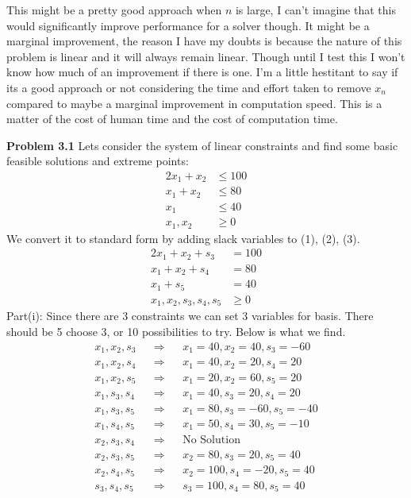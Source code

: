 \documentclass{article}
\begin{document}
This might be a pretty good approach when $n$ is large, I can't imagine that this would significantly improve performance for a solver though. It might be a marginal improvement, the reason I have my doubts is because the nature of this problem is linear and it will always remain linear. Though until I test this I won't know how much of an improvement if there is one. I'm a little hestitant to say if its a good approach or not considering the time and effort taken to remove $x_n$ compared to maybe a marginal improvement in computation speed. This is a matter of the cost of human time and the cost of computation time.

\textbf{Problem 3.1} Lets consider the system of linear constraints and find some basic feasible solutions and extreme points:
\begin{align}
    2x_1 + x_2 & \leq 100 \\
    x_1 + x_2 & \leq 80 \\
    x_1 & \leq 40 \\
    x_1, x_2 & \geq 0
\end{align} We convert it to standard form by adding slack variables to (1), (2), (3). 
\begin{align*}
    2x_1 + x_2 + s_3 & = 100 \\
    x_1 + x_2 + s_4 & = 80 \\
    x_1 + s_5 & = 40 \\
    x_1, x_2, s_3, s_4, s_5 & \geq 0
\end{align*} Part(i): Since there are 3 constraints we can set 3 variables for basis. There should be 5 choose 3, or 10 possibilities to try. Below is what we find.
\begin{align}
    x_1,x_2,s_3  && \Rightarrow && x_1 = 40, x_2 = 40, s_3 = -60 \\
    x_1, x_2,s_4 && \Rightarrow && x_1 = 40, x_2 = 20, s_4 = 20 \\
    x_1, x_2, s_5  && \Rightarrow && x_1 = 20, x_2 = 60, s_5 = 20\\
    x_1, s_3, s_4  && \Rightarrow && x_1 = 40, s_3 = 20, s_4 = 20\\
    x_1, s_3, s_5  && \Rightarrow && x_1 = 80, s_3 = -60, s_5 = -40\\ 
    x_1, s_4, s_5  && \Rightarrow && x_1 = 50, s_4 = 30, s_5 = -10 \\
    x_2, s_3, s_4  && \Rightarrow && \text{No Solution} \\ 
    x_2, s_3, s_5  && \Rightarrow && x_2 = 80, s_3 = 20, s_5 = 40\\
    x_2, s_4, s_5  && \Rightarrow && x_2 = 100, s_4 = -20, s_5 = 40\\ 
    s_3, s_4, s_5  && \Rightarrow && s_3 = 100, s_4 = 80, s_5 = 40 
\end{align}
\end{document}
